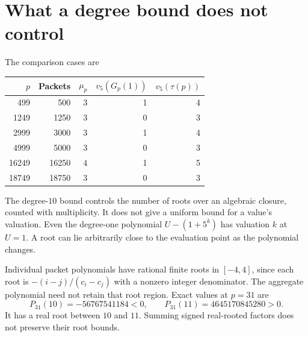 
\section{What a degree bound does not control}
The comparison cases are
\begin{center}
\begin{tabular}{rrrrr}
\toprule
$p$&Packets&$\mu_p$&$v_5(G_p(1))$&$v_5(\tau(p))$\\
\midrule
499&500&3&1&4\\
1249&1250&3&0&3\\
2999&3000&3&1&4\\
4999&5000&3&0&3\\
16249&16250&4&1&5\\
18749&18750&3&0&3\\
\bottomrule
\end{tabular}
\end{center}
The degree-$10$ bound controls the number of roots over an algebraic closure, counted with multiplicity. It does not give a uniform bound for a value's valuation. Even the degree-one polynomial $U-(1+5^k)$ has valuation $k$ at $U=1$. A root can lie arbitrarily close to the evaluation point as the polynomial changes.

Individual packet polynomials have rational finite roots in $[-4,4]$, since each root is $-(i-j)/(c_i-c_j)$ with a nonzero integer denominator. The aggregate polynomial need not retain that root region. Exact values at $p=31$ are
\[
P_{31}(10)=-56767541184<0,\qquad
P_{31}(11)=4645170845280>0.
\]
It has a real root between $10$ and $11$. Summing signed real-rooted factors does not preserve their root bounds.



